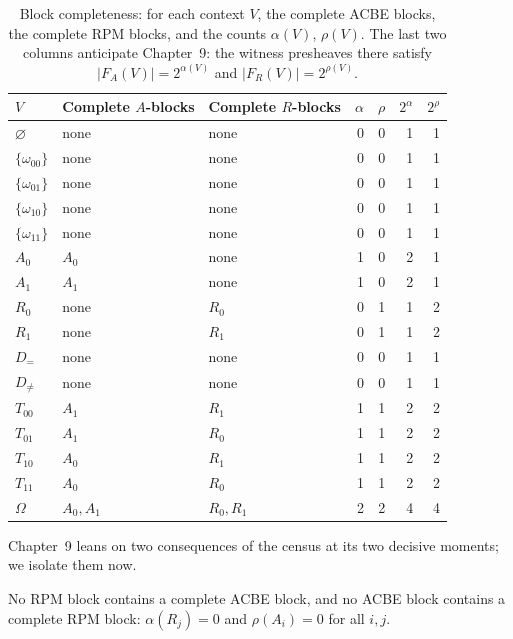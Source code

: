 \begin{table}[htbp]
\centering
\caption{Block completeness: for each context $V$, the complete ACBE blocks, the complete RPM blocks, and the counts $\alpha(V)$, $\rho(V)$. The last two columns anticipate Chapter~9: the witness presheaves there satisfy $|F_{A}(V)|=2^{\alpha(V)}$ and $|F_{R}(V)|=2^{\rho(V)}$.}
\label{ch07:tab-blocks}
\begin{tabular}{@{}lllrrrr@{}}
\toprule
$V$ & Complete $A$-blocks & Complete $R$-blocks & $\alpha$ & $\rho$ & $2^{\alpha}$ & $2^{\rho}$ \\
\midrule
$\varnothing$ & none & none & 0 & 0 & 1 & 1 \\
$\{\omega_{00}\}$ & none & none & 0 & 0 & 1 & 1 \\
$\{\omega_{01}\}$ & none & none & 0 & 0 & 1 & 1 \\
$\{\omega_{10}\}$ & none & none & 0 & 0 & 1 & 1 \\
$\{\omega_{11}\}$ & none & none & 0 & 0 & 1 & 1 \\
$A_{0}$ & $A_{0}$ & none & 1 & 0 & 2 & 1 \\
$A_{1}$ & $A_{1}$ & none & 1 & 0 & 2 & 1 \\
$R_{0}$ & none & $R_{0}$ & 0 & 1 & 1 & 2 \\
$R_{1}$ & none & $R_{1}$ & 0 & 1 & 1 & 2 \\
$D_{=}$ & none & none & 0 & 0 & 1 & 1 \\
$D_{\neq}$ & none & none & 0 & 0 & 1 & 1 \\
$T_{00}$ & $A_{1}$ & $R_{1}$ & 1 & 1 & 2 & 2 \\
$T_{01}$ & $A_{1}$ & $R_{0}$ & 1 & 1 & 2 & 2 \\
$T_{10}$ & $A_{0}$ & $R_{1}$ & 1 & 1 & 2 & 2 \\
$T_{11}$ & $A_{0}$ & $R_{0}$ & 1 & 1 & 2 & 2 \\
$\Omega$ & $A_{0},A_{1}$ & $R_{0},R_{1}$ & 2 & 2 & 4 & 4 \\
\bottomrule
\end{tabular}
\end{table}

Chapter~9 leans on two consequences of the census at its two decisive moments; we isolate them now.

\begin{corollary}\label{ch07:cor-blocks-cross}
No RPM block contains a complete ACBE block, and no ACBE block contains a complete RPM block: $\alpha(R_{j})=0$ and $\rho(A_{i})=0$ for all $i,j$.
\end{corollary}

